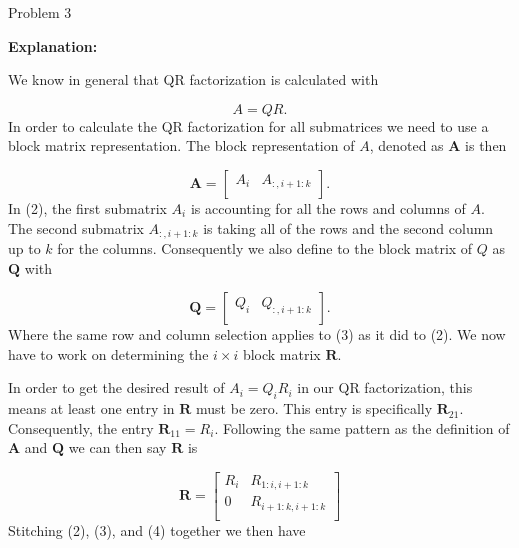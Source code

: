 \begin{problem}{Problem 3}
\begin{Highlight}[Solution]
        \noindent \textbf{Explanation:} \vspace*{1em}

        We know in general that QR factorization is calculated with 

        \begin{equation}
            A = QR.
        \end{equation}
        In order to calculate the QR factorization for all submatrices we need to use a block matrix representation. The block representation of $A$, denoted as $\mathbf{A}$ is then 

        \begin{equation}
            \mathbf{A} = 
            \begin{bmatrix}
                A_{i} & A_{:,i+1:k} \\
            \end{bmatrix}.
        \end{equation}
        In (2), the first submatrix $A_{i}$ is accounting for all the rows and columns of $A$. The second submatrix $A_{:,i+1:k}$ is taking all of the rows and the second column up to $k$ for the columns.
        Consequently we also define to the block matrix of $Q$ as $\mathbf{Q}$ with 

        \begin{equation}
            \mathbf{Q} = 
            \begin{bmatrix}
                Q_{i} & Q_{:,i+1:k} \\
            \end{bmatrix}.
        \end{equation}
        Where the same row and column selection applies to (3) as it did to (2). We now have to work on determining the $i \times i$ block matrix $\mathbf{R}$. 

        In order to get the desired result of $A_{i} = Q_{i}R_{i}$ in our QR factorization, this means at least one entry in $\mathbf{R}$ must be zero. This entry is specifically $\mathbf{R}_{21}$.
        Consequently, the entry $\mathbf{R}_{11} = R_{i}$. Following the same pattern as the definition of $\mathbf{A}$ and $\mathbf{Q}$ we can then say $\mathbf{R}$ is

        \begin{equation}
            \mathbf{R} = 
            \begin{bmatrix}
                R_{i} & R_{1:i,i+1:k} \\
                0 & R_{i+1:k,i+1:k} \\
            \end{bmatrix}
        \end{equation}
        Stitching (2), (3), and (4) together we then have 


\end{Highlight}
\end{problem}
